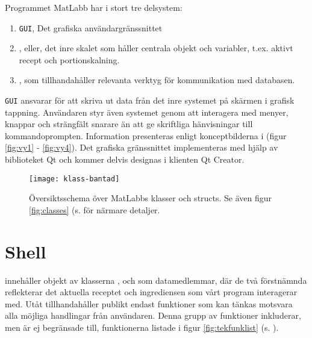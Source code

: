 Programmet MatLabb har i stort tre delsystem:

\begin{enumerate}
\item \verb+GUI+, Det grafiska användargränssnittet
\item \Shell, eller, det inre skalet som håller centrala objekt och variabler, t.ex. aktivt recept och portionskalning.
\item \Lookup, som tillhandahåller relevanta verktyg för kommunikation med databasen.
\end{enumerate}
\verb+GUI+ ansvarar för att skriva ut data från det inre systemet på skärmen i grafisk tappning. Användaren styr även systemet genom att interagera med menyer, knappar och strängfält snarare än att ge skriftliga hänvisningar till kommandoprompten. Information presenteras enligt konceptbilderna i (figur \ref{fig:vy1} - \ref{fig:vy4}). Det grafiska gränssnittet implementeras med hjälp av biblioteket Qt och kommer delvis designas i klienten Qt Creator.

\begin{figure}[h]
  \centering
  \texttt{[image: klass-bantad]}
  \caption{Översiktsschema över MatLabbs klasser och structs. Se även figur \ref{fig:classes} (s. \pageref{fig:classes)} för närmare detaljer.}
  \label{fig:redklass}
\end{figure}

\section{Shell}
\Shell{} innehåller objekt av klasserna \Recipe{}, \InfoIngredient{} och \Lookup{} som datamedlemmar, där de två förstnämnda reflekterar det aktuella receptet och ingrediensen som vårt program interagerar med. Utåt tillhandahåller \Shell publikt endast funktioner som kan tänkas motsvara alla möjliga handlingar från användaren. Denna grupp av funktioner inkluderar, men är ej begränsade till, funktionerna listade i figur \ref{fig:tekfunklist} (s. \pageref{fig:tekfunklist}).

